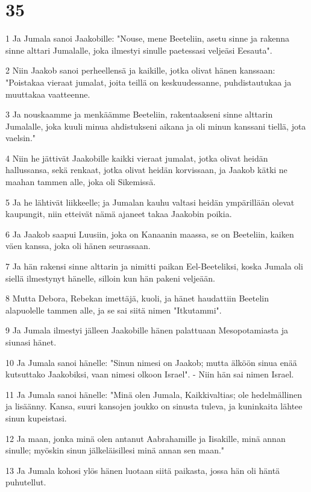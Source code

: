 \chapter{35}

\par 1 Ja Jumala sanoi Jaakobille: "Nouse, mene Beeteliin, asetu sinne ja rakenna sinne alttari Jumalalle, joka ilmestyi sinulle paetessasi veljeäsi Eesauta".
\par 2 Niin Jaakob sanoi perheellensä ja kaikille, jotka olivat hänen kanssaan: "Poistakaa vieraat jumalat, joita teillä on keskuudessanne, puhdistautukaa ja muuttakaa vaatteenne.
\par 3 Ja nouskaamme ja menkäämme Beeteliin, rakentaakseni sinne alttarin Jumalalle, joka kuuli minua ahdistukseni aikana ja oli minun kanssani tiellä, jota vaelsin."
\par 4 Niin he jättivät Jaakobille kaikki vieraat jumalat, jotka olivat heidän hallussansa, sekä renkaat, jotka olivat heidän korvissaan, ja Jaakob kätki ne maahan tammen alle, joka oli Sikemissä.
\par 5 Ja he lähtivät liikkeelle; ja Jumalan kauhu valtasi heidän ympärillään olevat kaupungit, niin etteivät nämä ajaneet takaa Jaakobin poikia.
\par 6 Ja Jaakob saapui Luusiin, joka on Kanaanin maassa, se on Beeteliin, kaiken väen kanssa, joka oli hänen seurassaan.
\par 7 Ja hän rakensi sinne alttarin ja nimitti paikan Eel-Beeteliksi, koska Jumala oli siellä ilmestynyt hänelle, silloin kun hän pakeni veljeään.
\par 8 Mutta Debora, Rebekan imettäjä, kuoli, ja hänet haudattiin Beetelin alapuolelle tammen alle, ja se sai siitä nimen "Itkutammi".
\par 9 Ja Jumala ilmestyi jälleen Jaakobille hänen palattuaan Mesopotamiasta ja siunasi hänet.
\par 10 Ja Jumala sanoi hänelle: "Sinun nimesi on Jaakob; mutta älköön sinua enää kutsuttako Jaakobiksi, vaan nimesi olkoon Israel". - Niin hän sai nimen Israel.
\par 11 Ja Jumala sanoi hänelle: "Minä olen Jumala, Kaikkivaltias; ole hedelmällinen ja lisäänny. Kansa, suuri kansojen joukko on sinusta tuleva, ja kuninkaita lähtee sinun kupeistasi.
\par 12 Ja maan, jonka minä olen antanut Aabrahamille ja Iisakille, minä annan sinulle; myöskin sinun jälkeläisillesi minä annan sen maan."
\par 13 Ja Jumala kohosi ylös hänen luotaan siitä paikasta, jossa hän oli häntä puhutellut.
